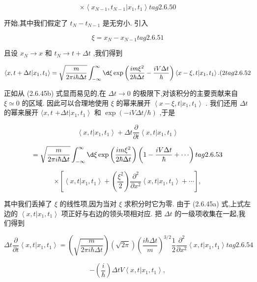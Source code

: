 \documentclass[lang=cn,newtx,10pt,scheme=chinese,thmcnt=section]{elegantbook}
\begin{document}
$$
\times \left\langle {{x}_{N - 1},{t}_{N - 1} | {x}_{1},{t}_{1}}\right\rangle tag{2.6.50}
$$

开始,其中我们假定了 ${t}_{N} - {t}_{N - 1}$ 是无穷小. 引入

$$
\xi = {x}_{N} - {x}_{N - 1} tag{2. 6.51}
$$

且设 ${x}_{N} \rightarrow x$ 和 ${t}_{N} \rightarrow t + {\Delta t}$ ,我们得到

$$
\left\langle {x, t + {\Delta t} | {x}_{1},{t}_{1}}\right\rangle = \sqrt{\frac{m}{{2\pi i}\hbar {\Delta t}}}\int_{-\infty }^{\infty }{\d \xi }\exp \left( {\frac{{im}{\xi }^{2}}{2\hbar {\Delta t}} - \frac{iV\Delta t}{\hbar }}\right) \left\langle {x - \xi, t | {x}_{1},{t}_{1}}\right\rangle .(2 tag{2.6.52}
$$

正如从 (2.6.45b) 式显而易见的,在 ${\Delta t} \rightarrow 0$ 的极限下,对该积分的主要贡献来自 $\xi \simeq 0$ 的区域. 因此可以合理地使用 $\xi$ 的幂来展开 $\left\langle {x - \xi, t | {x}_{1},{t}_{1}}\right\rangle$ . 我们还用 ${\Delta t}$ 的幂来展开 $\langle x, t$ $+ {\Delta t}\left| {{x}_{1},{t}_{1}}\right\rangle$ 和 $\exp \left( {-{iV\Delta t}/\hbar }\right)$ ,于是

$$
\left\langle {x, t | {x}_{1},{t}_{1}}\right\rangle + {\Delta t}\frac{\partial }{\partial t}\left\langle {x, t | {x}_{1},{t}_{1}}\right\rangle
$$

$$
= \sqrt{\frac{m}{{2\pi i}\hbar {\Delta t}}}\int_{-\infty }^{\infty }{\d \xi }\exp \left( \frac{{im}{\xi }^{2}}{2\hbar {\Delta t}}\right) \left( {1 - \frac{iV\Delta t}{\hbar } + \cdots }\right) tag{2. 6.53}
$$

$$
\times \left\lbrack {\left\langle {x, t | {x}_{1},{t}_{1}}\right\rangle + \left( \frac{{\xi }^{2}}{2}\right) \frac{{\partial }^{2}}{\partial {x}^{2}}\left\langle {x, t | {x}_{1},{t}_{1}}\right\rangle + \cdots }\right\rbrack ,
$$

其中我们丢掉了 $\xi$ 的线性项,因为当对 $\xi$ 求积分时它为零. 由于 (2.6.45a) 式,上式左边的 $\left\langle {x, t | {x}_{1},{t}_{1}}\right\rangle$ 项正好与右边的领头项相对应. 把 ${\Delta t}$ 的一级项收集在一起,我们得到

$$
{\Delta t}\frac{\partial }{\partial t}\left\langle {x, t | {x}_{1},{t}_{1}}\right\rangle = \left( \sqrt{\frac{m}{{2\pi i}\hbar {\Delta t}}}\right) \left( \sqrt{2\pi }\right) {\left( \frac{i\hbar {\Delta t}}{m}\right) }^{3/2}\frac{1}{2}\frac{{\partial }^{2}}{\partial {x}^{2}}\left\langle {x, t | {x}_{1},{t}_{1}}\right\rangle tag{2. 6.54}
$$

$$
- \left( \frac{i}{\hbar }\right) {\Delta tV}\left\langle {x, t | {x}_{1},{t}_{1}}\right\rangle ,
$$
\end{document}
